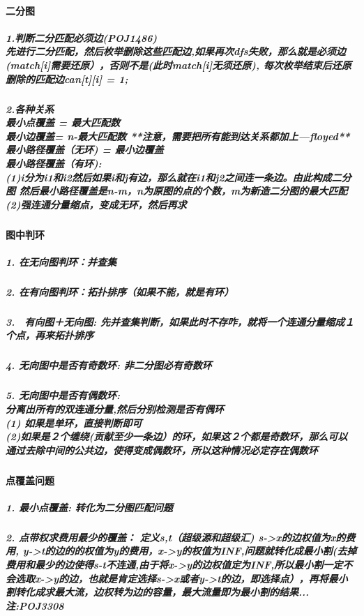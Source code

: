 \documentclass{article}
\begin{document}
\paragraph{二分图}
\subparagraph{1.判断二分匹配必须边(POJ1486)\\
先进行二分匹配，然后枚举删除这些匹配边,如果再次dfs失败，那么就是必须边(match[i]需要还原），否则不是(此时match[i]无须还原), 每次枚举结束后还原删除的匹配边can[t][i] = 1;}

\subparagraph{2.各种关系\\
最小点覆盖 = 最大匹配数\\
最小边覆盖= n-最大匹配数 **注意，需要把所有能到达关系都加上---floyed** \\
最小路径覆盖（无环) = 最小边覆盖  \\
最小路径覆盖（有环): \\
(1)i分为i1和i2然后如果i和j有边，那么就在i1和j2之间连一条边。由此构成二分图 然后最小路径覆盖是n-m，n为原图的点的个数，m为新造二分图的最大匹配 \\
(2)强连通分量缩点，变成无环，然后再求
}
\paragraph{图中判环}
\subparagraph{1. 在无向图判环：并查集}
\subparagraph{2. 在有向图判环：拓扑排序（如果不能，就是有环）}
\subparagraph{3.　有向图＋无向图: 先并查集判断，如果此时不存咋，就将一个连通分量缩成１个点，再来拓扑排序}
\subparagraph{4. 无向图中是否有奇数环:  非二分图必有奇数环}
\subparagraph{5. 无向图中是否有偶数环: \\ 分离出所有的双连通分量,然后分别检测是否有偶环 \\
(1) 如果是单环，直接判断即可 \\
(2)如果是２个缠绕(贡献至少一条边）的环，如果这２个都是奇数环，那么可以通过去除中间的公共边，使得变成偶数环，所以这种情况必定存在偶数环}
\paragraph{点覆盖问题}
\subparagraph{1. 最小点覆盖: 转化为二分图匹配问题}
\subparagraph{2. 点带权求费用最少的覆盖： 定义s,t（超级源和超级汇)  s->x的边权值为x的费用, y->t的边的的权值为y的费用，x->y的权值为INF,问题就转化成最小割(去掉费用和最少的边使得s-t不连通,由于将x->y的边权值定为INF,所以最小割一定不会选取x->y的边，也就是肯定选择s->x或者y->t的边，即选择点），再将最小割转化成求最大流，边权转为边的容量，最大流量即为最小割的结果... 注:POJ3308}
\end{document}

